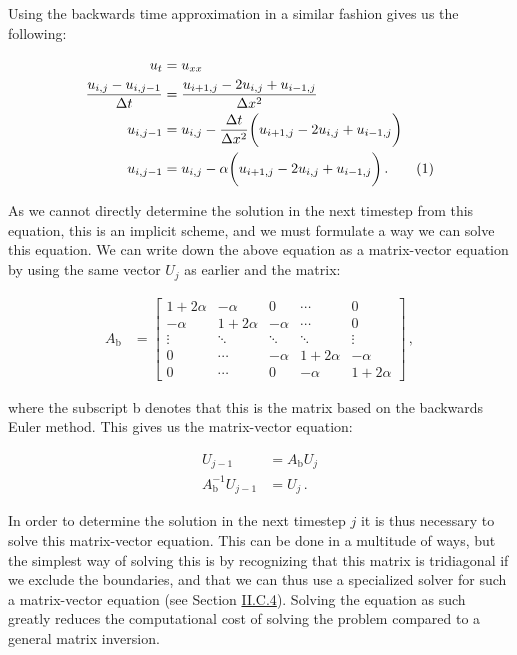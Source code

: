 \documentclass[reprint,english,notitlepage]{revtex4-1}  %
\newcommand\numberthis{\addtocounter{equation}{1}\tag{\theequation}}
\begin{document}
Using the backwards time approximation in a similar fashion gives us the following: 

\begin{align*}
u_t &= u_{xx} \\ 
\frac{u_{i,j} - u_{i,j-1}}{\Delta t} &= \frac{u_{i+1,j} - 2u_{i,j} + u_{i-1,j}}{\Delta x^2} \\
u_{i,j-1} &= u_{i,j} - \frac{\Delta t}{\Delta x^2} \bigg( u_{i+1,j} - 2u_{i,j} + u_{i-1,j} \bigg) \\
u_{i,j-1} &= u_{i,j} - \alpha \bigg( u_{i+1,j} - 2u_{i,j} + u_{i-1,j} \bigg) \, . \numberthis \label{eq:backward_euler_method}
\end{align*}

As we cannot directly determine the solution in the next timestep from this equation, this is an implicit scheme, and we must formulate a way we can solve this equation. We can write down the above equation as a matrix-vector equation by using the same vector $U_j$ as earlier and the matrix:

\begin{align*}
A_\text{b} &= \begin{bmatrix}
1 + 2\alpha & -\alpha & 0   &\cdots & 0 \\
-\alpha & 1+2\alpha & -\alpha   & \cdots & 0 \\
\vdots & \ddots & \ddots & \ddots  & \vdots \\
0 & \cdots  & -\alpha & 1 + 2\alpha & -\alpha \\
0 & \cdots & 0 & -\alpha & 1 + 2\alpha 
\end{bmatrix} \, , 
\end{align*} 

where the subscript b denotes that this is the matrix based on the backwards Euler method. This gives us the matrix-vector equation:

\begin{align*}
U_{j-1} &= A_\text{b} U_j \\
A_\text{b}^{-1} U_{j-1} &= U_j \, .
\end{align*}


In order to determine the solution in the next timestep $j$ it is thus necessary to solve this matrix-vector equation. This can be done in a multitude of ways, but the simplest way of solving this is by recognizing that this matrix is tridiagonal if we exclude the boundaries, and that we can thus use a specialized solver for such a matrix-vector equation (see Section \hyperref[sec:formalism_tridiagonal_solver]{II.C.4}). Solving the equation as such greatly reduces the computational cost of solving the problem compared to a general matrix inversion.
\end{document}
